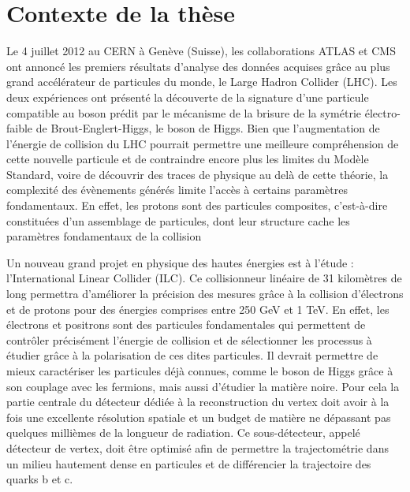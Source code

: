 \documentclass[a4papper, 10pt]{article}
\title{\textbf{Intelligent detection layers for advanced tracking in high-energy physics} \\ \large \vskip 1ex
        Résumé de la thèse de doctorat}
\author{Benjamin Boitrelle \\ 
        Sous la direction de : \\
        Jérôme Baudot : Directeur de thèse à l'Université de Strasbourg \\
        Ingrid Maria Gregor : Encadrante au laboratoire d'accueil au DESY de Hambourg}
\date{}
\begin{document}
    \maketitle


  \section{Contexte de la thèse}

  Le 4 juillet 2012 au CERN à Genève (Suisse), les collaborations ATLAS et CMS ont annoncé les premiers résultats d'analyse des données acquises grâce au plus grand accélérateur de particules du monde, le Large Hadron Collider (LHC). 
  Les deux expériences ont présenté la découverte de la signature d'une particule compatible au boson prédit par le mécanisme de la brisure de la symétrie électro-faible de Brout-Englert-Higgs, le boson de Higgs.
  Bien que l'augmentation de l'énergie de collision du LHC pourrait permettre une meilleure compréhension de cette nouvelle particule et de contraindre encore plus les limites du Modèle Standard, voire de découvrir des traces de physique au delà de cette théorie, la complexité des évènements générés limite l'accès à certains paramètres fondamentaux.
  En effet, les protons sont des particules composites, c'est-à-dire constituées d'un assemblage de particules, dont leur structure cache les paramètres fondamentaux de la collision

  Un nouveau grand projet en physique des hautes énergies est à l'étude : l'International Linear Collider (ILC). 
  Ce collisionneur linéaire de 31 kilomètres de long permettra d'améliorer la précision des mesures grâce à la collision d'électrons et de protons pour des énergies comprises entre 250 GeV et 1 TeV.
  En effet, les électrons et positrons sont des particules fondamentales qui permettent de contrôler précisément l'énergie de collision et de sélectionner les processus à étudier grâce à la polarisation de ces dites particules.
  Il devrait permettre de mieux caractériser les particules déjà connues, comme le boson de Higgs grâce à son couplage avec les fermions, mais aussi d'étudier la matière noire. 
  Pour cela la partie centrale du détecteur dédiée à la reconstruction du vertex doit avoir à la fois une excellente résolution spatiale et un budget de matière ne dépassant pas quelques millièmes de la longueur de radiation. 
  Ce sous-détecteur, appelé détecteur de vertex, doit être optimisé afin de permettre la trajectométrie dans un milieu hautement dense en particules et de différencier la trajectoire des quarks b et c.
\end{document}
